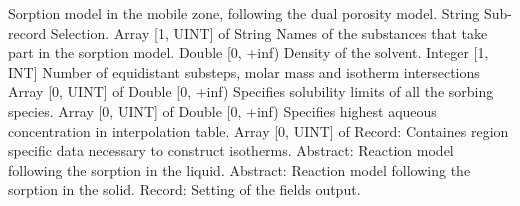 \begin{RecordType}
	{}
	{} %
	{} %
	{} %
	{{{Sorption model in the mobile zone, following the dual porosity model.}}}
		\KeyItem
			{}
			{{String}}
			{\textrangle}
			{} %
			{{{Sub-record Selection.}}}
		\KeyItem
			{}
			{{Array [1, UINT] of }{String}}
			{\textrangle}
			{} %
			{{{Names of the substances that take part in the sorption model.}}}
		\KeyItem
			{}
			{{Double [0, +inf)}}
			{\textrangle}
			{} %
			{{{Density of the solvent.}}}
		\KeyItem
			{}
			{{Integer [1, INT]}}
			{\textrangle}
			{} %
			{{{Number of equidistant substeps, molar mass and isotherm intersections}}}
		\KeyItem
			{}
			{{Array [0, UINT] of }{Double [0, +inf)}}
			{\textrangle}
			{} %
			{{{Specifies solubility limits of all the sorbing species.}}}
		\KeyItem
			{}
			{{Array [0, UINT] of }{Double [0, +inf)}}
			{\textrangle}
			{} %
			{{{Specifies highest aqueous concentration in interpolation table.}}}
		\KeyItem
			{}
			{{Array [0, UINT] of }{Record}{: }}
			{\textrangle}
			{} %
			{{{Containes region specific data necessary to construct isotherms.}}}
		\KeyItem
			{}
			{{Abstract}{: }}
			{\textrangle}
			{} %
			{{{Reaction model following the sorption in the liquid.}}}
		\KeyItem
			{}
			{{Abstract}{: }}
			{\textrangle}
			{} %
			{{{Reaction model following the sorption in the solid.}}}
		\KeyItem
			{}
			{{Record}{: }}
			{\textrangle}
			{} %
			{{{Setting of the fields output.}}}
\end{RecordType}
